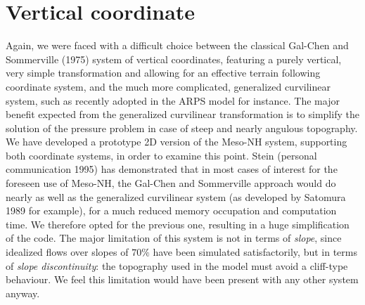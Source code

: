 \section{Vertical coordinate}
Again, we were faced with a difficult choice between the classical Gal-Chen
and Sommerville (1975)
 system of vertical coordinates, featuring a purely vertical,
very simple transformation and allowing for an effective terrain following
coordinate system, and the much more complicated, generalized curvilinear
system, such as recently adopted in the ARPS model for instance. The major
benefit expected from the generalized curvilinear transformation
is to simplify the solution of the pressure problem in case of steep and
nearly angulous topography. We have developed a prototype 2D version of
the Meso-NH system, supporting both coordinate systems, in order to examine
this point. Stein (personal communication 1995) has demonstrated that
in most cases of interest for the foreseen use of Meso-NH, the Gal-Chen and
Sommerville approach would do nearly as well as the generalized curvilinear
system (as developed by Satomura 1989 for example), for a much reduced
memory occupation and computation time. We therefore opted for the previous
one, resulting in a huge simplification of the code. The major limitation
of this system is not in terms of {\em slope}, since idealized flows over slopes
of $70\%$ have been simulated satisfactorily, but in terms of {\em slope
discontinuity}: the topography used in the model must avoid a cliff-type
 behaviour.
We feel this limitation would have been present with any other system anyway.


